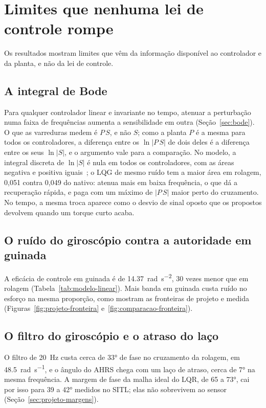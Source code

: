 \section{Limites que nenhuma lei de controle rompe}
\label{sec:limites}

Os resultados mostram limites que vêm da informação disponível ao controlador
e da planta, e não da lei de controle.

\subsection{A integral de Bode}

Para qualquer controlador linear e invariante
no tempo, atenuar a perturbação numa faixa de frequências aumenta a
sensibilidade em outra (Seção~\ref{sec:bode}). O que as varreduras medem é
$P\,S$, e não $S$; como a planta $P$ é a mesma para todos os controladores, a
diferença entre os $\ln|P\,S|$ de dois deles é a diferença entre os seus
$\ln|S|$, e o argumento vale para a comparação. No modelo, a integral
discreta de $\ln|S|$ é nula em todos os controladores, com as áreas negativa
e positiva iguais~\cite{sung1988,mohtadi1990}; o LQG de mesmo ruído tem a
maior área em rolagem, 0,051 contra 0,049 do nativo: atenua mais em baixa
frequência, o que dá a recuperação rápida, e paga com um máximo de $|P\,S|$
maior perto do cruzamento. No tempo, a mesma troca aparece como o desvio de
sinal oposto que os propostos devolvem quando um torque curto acaba.

\subsection{O ruído do giroscópio contra a autoridade em guinada}

A
eficácia de controle em guinada é de \SI{14.37}{\radian\per\second\squared},
30 vezes menor que em rolagem (Tabela~\ref{tab:modelo-linear}). Mais banda
em guinada custa ruído no esforço na mesma proporção, como mostram as
fronteiras de projeto e medida (Figuras~\ref{fig:projeto-fronteira}
e~\ref{fig:comparacao-fronteira}).

\subsection{O filtro do giroscópio e o atraso do laço}

O filtro de
\SI{20}{\hertz} custa cerca de \ang{33} de fase no cruzamento da rolagem, em
\SI{48.5}{\radian\per\second}, e o ângulo do AHRS chega com um laço de atraso,
cerca de \ang{7} na mesma frequência. A margem de fase da malha ideal do
LQR, de 65 a \ang{73}, cai por isso para 39 a \ang{42} medidos no SITL;
elas não sobrevivem ao sensor (Seção~\ref{sec:projeto-margens}).

